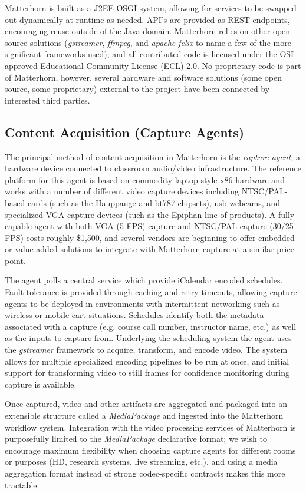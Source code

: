 \documentclass[letterpaper]{sig-alternate}
\begin{document}
Matterhorn is built as a J2EE OSGI system, allowing for services to be swapped out dynamically at runtime as needed.  API's are provided as REST endpoints, encouraging reuse outside of the Java domain.  Matterhorn relies on other open source solutions (\emph{gstreamer}, \emph{ffmpeg}, and \emph{apache felix} to name a few of the more significant frameworks used), and all contributed code is licensed under the OSI approved Educational Community License (ECL) 2.0.  No proprietary code is part of Matterhorn, however, several hardware and software solutions (some open source, some proprietary) external to the project have been connected by interested third parties.

\subsection{Content Acquisition (Capture Agents)}
The principal method of content acquisition in Matterhorn is the \emph{capture agent}; a hardware device connected to classroom audio/video infrastructure.  The reference platform for this agent is based on commodity laptop-style x86 hardware and works with a number of different video capture devices including NTSC/PAL-based cards (such as the Hauppauge and bt787 chipsets), usb webcams, and specialized VGA capture devices (such as the Epiphan line of products).  A fully capable agent with both VGA (5 FPS) capture and NTSC/PAL capture (30/25 FPS) costs roughly \$1,500, and several vendors are beginning to offer embedded or value-added solutions to integrate with Matterhorn capture at a similar price point.

The agent polls a central service which provide iCalendar encoded schedules.  Fault tolerance is provided through caching and retry timeouts, allowing capture agents to be deployed in environments with intermittent networking such as wireless or mobile cart situations.  Schedules identify both the metadata associated with a capture (e.g. course call number, instructor name, etc.) as well as the inputs to capture from.  Underlying the scheduling system the agent uses the \emph{gstreamer} framework to acquire, transform, and encode video.  The system allows for multiple specialized encoding pipelines to be run at once, and initial support for transforming video to still frames for confidence monitoring during capture is available.

Once captured, video and other artifacts are aggregated and packaged into an extensible structure called a \emph{MediaPackage} and ingested into the Matterhorn workflow system.  Integration with the video processing services of Matterhorn is purposefully limited to the \emph{MediaPackage} declarative format; we wish to encourage maximum flexibility when choosing capture agents for different rooms or purposes (HD, research systems, live streaming, etc.), and using a media aggregation format instead of strong codec-specific contracts makes this more tractable.
\end{document}
